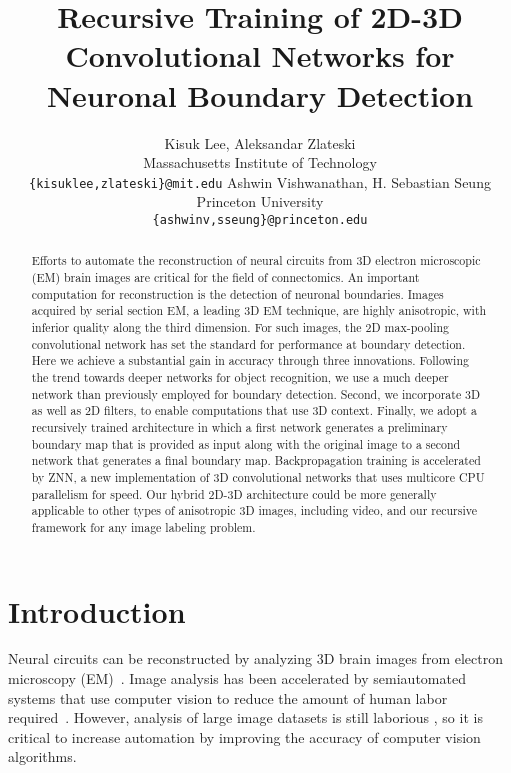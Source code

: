 \documentclass{article} %
\title{Recursive Training of 2D-3D Convolutional Networks for Neuronal Boundary Detection}
\author{
Kisuk Lee, Aleksandar Zlateski\\
Massachusetts Institute of Technology \\
\texttt{\{kisuklee,zlateski\}@mit.edu}
\And
Ashwin Vishwanathan, H. Sebastian Seung \\
Princeton University \\
\texttt{\{ashwinv,sseung\}@princeton.edu}
}
\begin{document}
\maketitle

\begin{abstract}
Efforts to automate the reconstruction of neural circuits from 3D
electron microscopic (EM) brain images are critical for the field of
connectomics. An important computation for reconstruction is the
detection of neuronal boundaries. Images acquired by serial section
EM, a leading 3D EM technique, are highly anisotropic, with inferior
quality along the third dimension. For such images, the 2D
max-pooling convolutional network has set the standard for performance
at boundary detection. Here we achieve a substantial gain in accuracy
through three innovations. Following the trend towards deeper
networks for object recognition, we use a much deeper network than
previously employed for boundary detection. Second, we incorporate 3D
as well as 2D filters, to enable computations that use 3D context.
Finally, we adopt a recursively trained architecture in which a first network
generates a preliminary boundary map that is provided as input along
with the original image to a second network that generates a final
boundary map. Backpropagation training is accelerated by ZNN, a new
implementation of 3D convolutional networks that uses multicore CPU
parallelism for speed. Our hybrid 2D-3D architecture could be more
generally applicable to other types of anisotropic 3D images,
including video, and our recursive framework for any image labeling
problem.
\end{abstract}



\section{Introduction}

Neural circuits can be reconstructed by analyzing 3D brain images from
electron microscopy (EM)~\cite{White1986}. Image analysis has been accelerated
by semiautomated systems that use computer vision to reduce the amount
of human labor required~\cite{Takemura2013,
  Helmstaedter2013,Kim2014}. However, analysis of large image datasets
is still laborious \cite{Helmstaedter2014}, so it is critical to increase
automation by improving the accuracy of computer vision algorithms.
\end{document}
